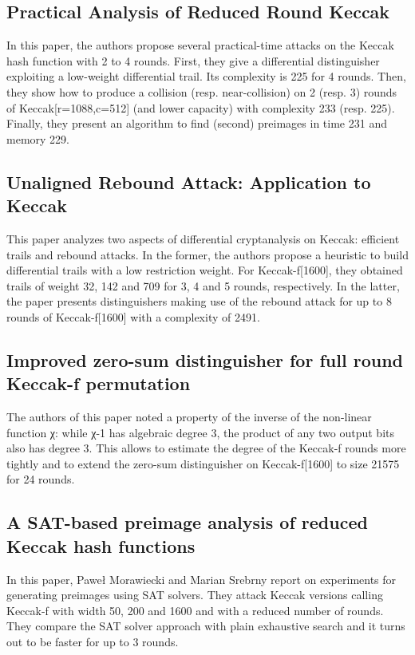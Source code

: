\subsection{Practical Analysis of Reduced Round Keccak} \cite{00024}
In this paper, the authors propose several practical-time attacks on the Keccak hash function with 2 to 4 rounds. 
First, they give a differential distinguisher exploiting a low-weight differential trail. Its complexity is 225 for 4 
rounds. Then, they show how to produce a collision (resp. near-collision) on 2 (resp. 3) rounds of Keccak[r=1088,c=512] 
(and lower capacity) with complexity 233 (resp. 225). Finally, they present an algorithm to find (second) preimages in 
time 231 and memory 229.

\subsection{Unaligned Rebound Attack: Application to Keccak} \cite{00025}
This paper analyzes two aspects of differential cryptanalysis on Keccak: efficient trails and rebound attacks. In the 
former, the authors propose a heuristic to build differential trails with a low restriction weight. For Keccak-f[1600], 
they obtained trails of weight 32, 142 and 709 for 3, 4 and 5 rounds, respectively. In the latter, the paper presents 
distinguishers making use of the rebound attack for up to 8 rounds of Keccak-f[1600] with a complexity of 2491.

\subsection{Improved zero-sum distinguisher for full round Keccak-f permutation} \cite{00026}
The authors of this paper noted a property of the inverse of the non-linear function χ: while χ-1 has algebraic degree 3,
the product of any two output bits also has degree 3. This allows to estimate the degree of the Keccak-f rounds more tightly 
and to extend the zero-sum distinguisher on Keccak-f[1600] to size 21575 for 24 rounds.

\subsection{A SAT-based preimage analysis of reduced Keccak hash functions} \cite{00027}
In this paper, Paweł Morawiecki and Marian Srebrny report on experiments for generating preimages using SAT solvers. 
They attack Keccak versions calling Keccak-f with width 50, 200 and 1600 and with a reduced number of rounds. 
They compare the SAT solver approach with plain exhaustive search and it turns out to be faster for up to 3 rounds.

